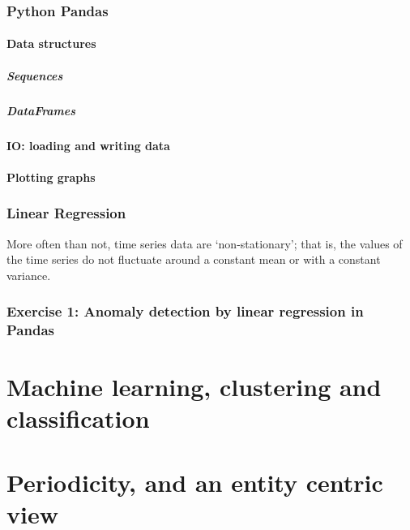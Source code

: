 \documentclass[aspectratio=169]{beamer}
\begin{document}
\section{Python Pandas}
\subsection{Data structures}
\subsubsection{Sequences}
\subsubsection{DataFrames}
\subsection{IO: loading and writing data}
\subsection{Plotting graphs}

\section{Linear Regression}
More often than not, time series data are `non-stationary'; that is, the values of the time series do not fluctuate around a constant mean or with a constant variance.
\section{Exercise 1: Anomaly detection by linear regression in Pandas}

\part{Machine learning, clustering and classification}

\part{Periodicity, and an entity centric view}
\end{document}
